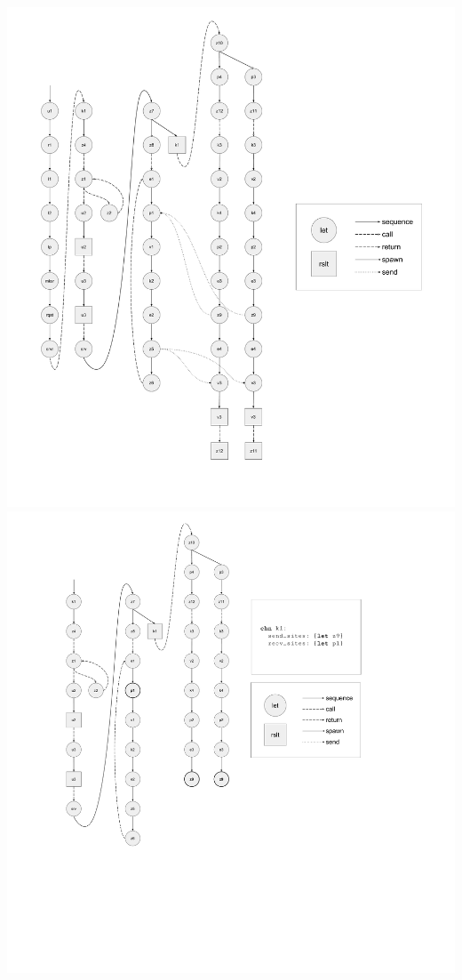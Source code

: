 \documentclass{article}
\begin{document}
\includegraphics[width=1.3\textwidth, left]{cml_graph_lp.pdf}
\includegraphics[width=1.3\textwidth, left]{cml_graph_k1.pdf}
\end{document}

